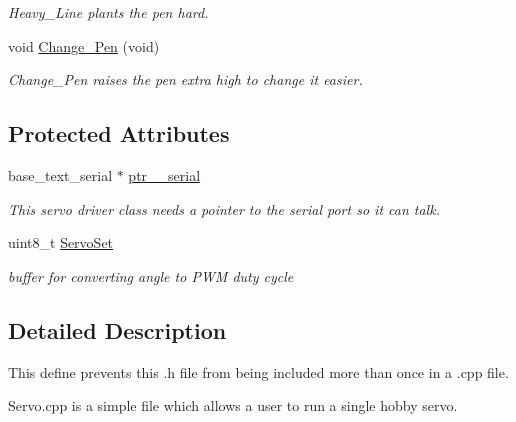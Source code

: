 \begin{DoxyCompactItemize}
\begin{DoxyCompactList}\small\item\em Heavy\-\_\-\-Line plants the pen hard. \end{DoxyCompactList}\item 
\hypertarget{classservo_abf07bb1d2a9a8cbadcabf3f12da09ffc}{void \hyperlink{classservo_abf07bb1d2a9a8cbadcabf3f12da09ffc}{Change\-\_\-\-Pen} (void)}\label{classservo_abf07bb1d2a9a8cbadcabf3f12da09ffc}

\begin{DoxyCompactList}\small\item\em Change\-\_\-\-Pen raises the pen extra high to change it easier. \end{DoxyCompactList}\end{DoxyCompactItemize}
\subsection*{Protected Attributes}
\begin{DoxyCompactItemize}
\item 
\hypertarget{classservo_af0e4b202a4463029ce78ed775985ef46}{base\-\_\-text\-\_\-serial $\ast$ \hyperlink{classservo_af0e4b202a4463029ce78ed775985ef46}{ptr\-\_\-\_\-serial}}\label{classservo_af0e4b202a4463029ce78ed775985ef46}

\begin{DoxyCompactList}\small\item\em This servo driver class needs a pointer to the serial port so it can talk. \end{DoxyCompactList}\item 
\hypertarget{classservo_a9ba9dab8211cd41e05b3ec233fdf27d7}{uint8\-\_\-t \hyperlink{classservo_a9ba9dab8211cd41e05b3ec233fdf27d7}{Servo\-Set}}\label{classservo_a9ba9dab8211cd41e05b3ec233fdf27d7}

\begin{DoxyCompactList}\small\item\em buffer for converting angle to P\-W\-M duty cycle \end{DoxyCompactList}\end{DoxyCompactItemize}


\subsection{Detailed Description}
This define prevents this .h file from being included more than once in a .cpp file. 

Servo.\-cpp is a simple file which allows a user to run a single hobby servo. 

